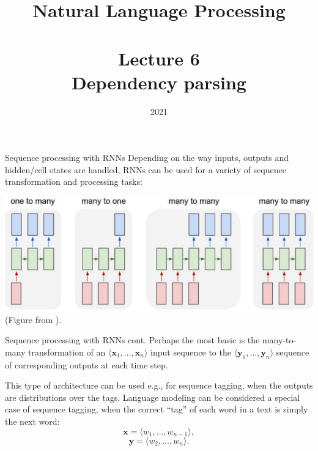 \documentclass[style=upen, size=14pt]{powerdot}
\theoremstyle{definition}
\begin{document}
\title{Natural Language Processing\\~~\\Lecture 6\\Dependency parsing}

\date{2021}
\maketitle

\begin{slide}[toc= RNN seq processing]{Sequence processing with RNNs}
  Depending on the way inputs, outputs and hidden/cell states are handled, RNNs
  can be used for a variety of sequence transformation and processing tasks:
  \begin{center}
    \includegraphics[width=1\textwidth]{figures/rnn_topologies.eps}
    \footnotesize{(Figure from \cite{karpathy2015unreasonable}).}
  \end{center}
\end{slide}

\begin{slide}[toc=]{Sequence processing with RNNs cont.}
  Perhaps the most basic is the many-to-many transformation of an
  $\langle \mathbf{x}_1,\dots,\mathbf{x}_n \rangle$ input sequence to the
  $\langle \mathbf{y}_1,\dots,\mathbf{y}_n\rangle$ sequence of corresponding
  outputs at each time step.

  This type of architecture can be used e.g., for sequence tagging, when the
  outputs are distributions over the tags. Language modeling can be considered a
  special case of sequence tagging, when the correct ``tag'' of each word in a text is
  simply the next word:
  $$
  \mathbf{x} = \langle w_1,\dots,w_{n-1}\rangle,
  $$
  $$
  \mathbf{y} = \langle w_2,\dots,w_{n}\rangle.
  $$
\end{slide}
\end{document}

